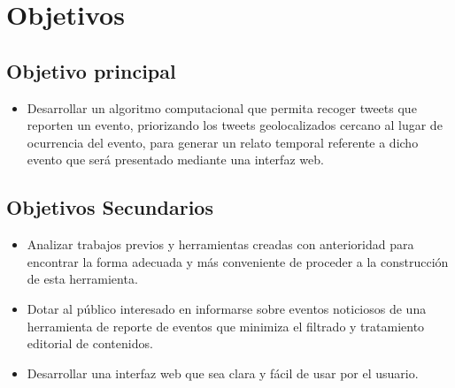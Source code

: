 \section{Objetivos}

\subsection{Objetivo principal}

\begin{itemize}
\item Desarrollar un algoritmo computacional que permita recoger tweets que reporten un evento, priorizando 
los tweets geolocalizados cercano al lugar de ocurrencia del evento, para generar un relato temporal
referente a dicho evento que será presentado mediante una interfaz web.
\end{itemize}

\subsection{Objetivos Secundarios}
\begin{itemize}
\item Analizar trabajos previos y herramientas creadas con anterioridad para encontrar la forma adecuada y más conveniente de proceder a la construcción de esta herramienta.
\item Dotar al público interesado en informarse sobre eventos noticiosos de una herramienta de reporte de eventos que minimiza el filtrado y tratamiento editorial de contenidos.
\item Desarrollar una interfaz web que sea clara y fácil de usar por el usuario.
\end{itemize}